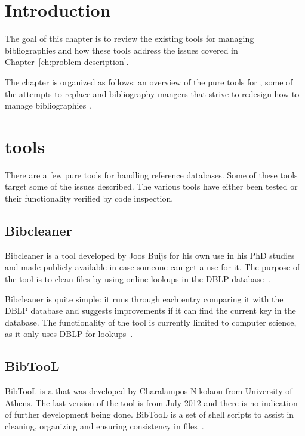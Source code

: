 \section{Introduction}
The goal of this chapter is to review the existing tools for managing
bibliographies and how these tools address the issues covered in
Chapter~\ref{ch:problem-description}.

The chapter is organized as follows: an overview of the pure tools for
{\bibtex} , some of the attempts to replace
{\bibtex}  and bibliography mangers
that strive to redesign how to manage bibliographies
.


\section{{\bibtex} tools}
\label{sec:bibtex_tools}
There are a few pure {\bibtex} tools for handling reference databases.
Some of these tools target some of the issues described.  The various
tools have either been tested or their functionality verified by code
inspection.

\subsection{Bibcleaner}
Bibcleaner is a tool developed by Joos Buijs for his own use in his
PhD studies and made publicly available in case someone can get a use
for it.  The purpose of the tool is to clean {\bibtex} files by using
online lookups in the DBLP database~\cite{bibcleaner_source,
  bibcleaner_question}.

Bibcleaner is quite simple: it runs through each entry comparing it
with the DBLP database and suggests improvements if it can find the
current key in the database.  The functionality of the tool is
currently limited to computer science, as it only uses DBLP for
lookups~\cite{bibcleaner_source}.

\subsection{BibTooL}
BibTooL is a {\bibtex} that was developed by Charalampos Nikolaou from
University of Athens.  The last version of the tool is from July 2012
and there is no indication of further development being done.  BibTooL
is a set of shell scripts to assist in cleaning, organizing and
ensuring consistency in {\bibtex} files~\cite{bibtool_site}.


